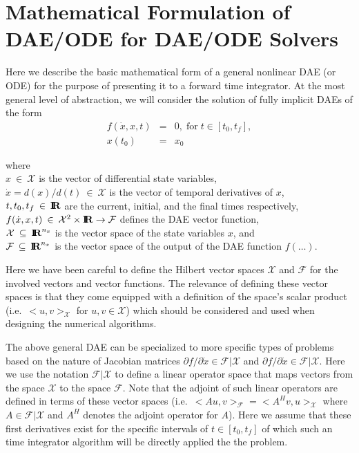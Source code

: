 \documentclass[pdf,ps2pdf,11pt]{SANDreport}
\begin{document}
\section{Mathematical Formulation of DAE/ODE for DAE/ODE Solvers}
\label{rythmos:scn:mathformulation}

Here we describe the basic mathematical form of a general nonlinear DAE (or
ODE) for the purpose of presenting it to a forward time integrator.  At the
most general level of abstraction, we will consider the solution of fully
implicit DAEs of the form
%
\begin{eqnarray}
f(\dot{x},x,t) & = & 0, \; \mbox{for} \; t \in [t_0, t_f], \label{rythmos:eqn:dae} \\
x(t_0) & = & x_0 \label{rythmos:eqn:dae:ic}
\end{eqnarray}
\begin{tabbing}
\hspace{4ex}where\hspace{5ex}\= \\
\>	$x\:\in\:\mathcal{X}$ is the vector of differential state variables, \\
\>	$\dot{x} = d(x)/d(t)\:\in\:\mathcal{X}$ is the vector of temporal derivatives of $x$, \\
\>	$t, t_0, t_f\:\in\:\mbox{\textbf{I}}\hspace{-0.6ex}\mbox{\textbf{R}}$ are the current, initial, and the final times respectively, \\
\>	$f(\dot{x},x,t)\:\in\:\mathcal{X}^2\times\mbox{\textbf{I}}\hspace{-0.6ex}\mbox{\textbf{R}}\rightarrow\mathcal{F}$ defines the DAE vector function, \\
\>	$\mathcal{X} \:\subseteq\:\mbox{\textbf{I}}\hspace{-0.6ex}\mbox{\textbf{R}}^{n_x}$ is the vector space of the state variables $x$, and \\
\>	$\mathcal{F} \:\subseteq\:\mbox{\textbf{I}}\hspace{-0.6ex}\mbox{\textbf{R}}^{n_x}$ is the vector space of the output of the DAE function $f(\ldots)$.
\end{tabbing}

Here we have been careful to define the Hilbert vector spaces $\mathcal{X}$
and $\mathcal{F}$ for the involved vectors and vector functions.  The
relevance of defining these vector spaces is that they come equipped with a
definition of the space's scalar product (i.e.\ $<u,v>_{\mathcal{X}}$ for
$u,v\in\mathcal{X}$) which should be considered and used when designing the
numerical algorithms.

The above general DAE can be specialized to more specific types of problems
based on the nature of Jacobian matrices ${}\partial f / {}\partial
{}\dot{x}\in\mathcal{F}|\mathcal{X}$ and ${}\partial f / {}\partial
{}\dot{x}\in\mathcal{F}|\mathcal{X}$.  Here we use the notation
$\mathcal{F}|\mathcal{X}$ to define a linear operator space that maps vectors
from the space $\mathcal{X}$ to the space $\mathcal{F}$.  Note that the
adjoint of such linear operators are defined in terms of these vector spaces
(i.e.\ $<A u,v>_{\mathcal{F}} = <A^H v,u>_{\mathcal{X}}$ where
$A\in\mathcal{F}|\mathcal{X}$ and $A^H$ denotes the adjoint operator for $A$).
Here we assume that these first derivatives exist for the specific intervals
of  $t\in[t_0,t_f]$ of which such an time integrator algorithm will be
directly applied the the problem.
\end{document}
